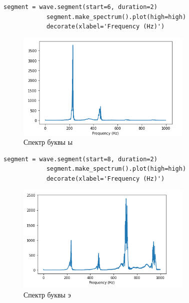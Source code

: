 \documentclass[a4paper,12pt]{article}
\begin{document}
\begin{enumerate}
		\begin{lstlisting}[caption=Спектр буквы ы]
			segment = wave.segment(start=6, duration=2)
			segment.make_spectrum().plot(high=high)
			decorate(xlabel='Frequency (Hz)')
		\end{lstlisting}
		\begin{figure}[H]
			\centering
			\includegraphics[width=0.75\textwidth]{6_5.png}
			\caption{Спектр буквы ы}
			\label{fig:6.5}
		\end{figure}
		
		\begin{lstlisting}[caption=Спектр буквы э]
			segment = wave.segment(start=8, duration=2)
			segment.make_spectrum().plot(high=high)
			decorate(xlabel='Frequency (Hz)')
		\end{lstlisting}
		\begin{figure}[H]
			\centering
			\includegraphics[width=0.75\textwidth]{6_6.png}
			\caption{Спектр буквы э}
			\label{fig:6.6}
		\end{figure}
		

\end{enumerate}
\end{document}
